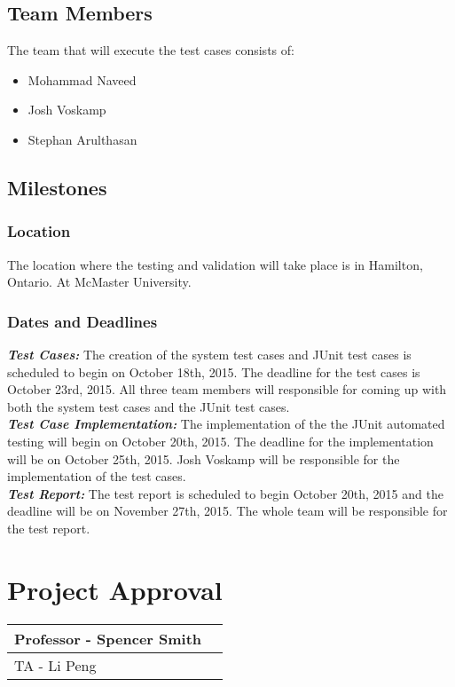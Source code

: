 \documentclass[12pt]{article}
\begin{document}
\subsection{Team Members}
The team that will execute the test cases consists of:

\begin{itemize}
	\item Mohammad Naveed
	\item Josh Voskamp
	\item Stephan Arulthasan
\end{itemize}

\subsection{Milestones}

\subsubsection{Location}
The location where the testing and validation will take place is in Hamilton,
Ontario. At McMaster University.

\subsubsection{Dates and Deadlines}
\textbf{\emph{Test Cases:}}
The creation of the system test cases and JUnit test cases is scheduled to
begin on October 18th, 2015. The deadline for the test cases is October 23rd,
2015. All three team members will responsible for coming up with both the
system test cases and the JUnit test cases.\\
\textbf{\emph{Test Case Implementation:}}
The implementation of the the JUnit automated testing will begin on October
20th, 2015. The deadline for the implementation will be on October 25th, 2015.
Josh Voskamp will be responsible for the implementation of the test cases.\\
\textbf{\emph{Test Report:}}
The test report is scheduled to begin October 20th, 2015 and the deadline will
be on November 27th, 2015. The whole team will be responsible for the test
report.

\section{Project Approval}

\begin{center}
	\begin{tabular}{ | p{5cm} | p{5cm} |}
		\hline
		Professor - Spencer Smith &  \\ \hline
		TA - Li Peng &  \\ \hline
	\end{tabular}
\end{center}
\end{document}
